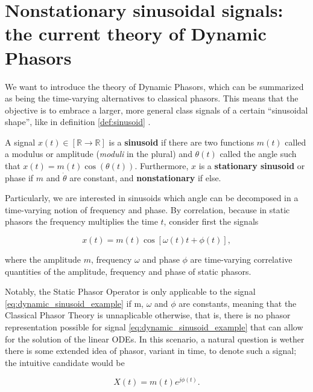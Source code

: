 \section{Nonstationary sinusoidal signals: the current theory of Dynamic Phasors} %

	We want to introduce the theory of Dynamic Phasors, which can be summarized as being the time-varying alternatives to classical phasors. This means that the objective is to embrace a larger, more general class signals of a certain ``sinusoidal shape'', like in definition \ref{def:sinusoid} .

\begin{definition}[Sinusoid] \label{def:sinusoid} %
	A signal $x(t)\in\left[\mathbb{R}\to\mathbb{R}\right]$ is a \textbf{sinusoid} if there are two functions $m(t)$ called a modulus or amplitude (\textit{moduli} in the plural) and $\theta(t)$ called the angle such that $x(t) = m(t)\cos\left(\theta(t)\right)$. Furthermore, $x$ is a \textbf{stationary sinusoid} or phase if $m$ and $\dot{\theta}$ are constant, and \textbf{nonstationary} if else.
\end{definition} %

	Particularly, we are interested in sinusoids which angle can be decomposed in a time-varying notion of frequency and phase. By correlation, because in static phasors the frequency multiplies the time $t$, consider first the signals

\begin{equation} x(t) = m\left(t\right)\cos\left[\omega(t) t + \phi(t)\right], \label{eq:dynamic_sinusoid_example}\end{equation}

	\noindent where the amplitude $m$, frequency $\omega$ and phase $\phi$ are time-varying correlative quantities of the amplitude, frequency and phase of static phasors.

	Notably, the Static Phasor Operator is only applicable to the signal \eqref{eq:dynamic_sinusoid_example} if m, $\omega$ and $\phi$ are constants, meaning that the Classical Phasor Theory is unnaplicable otherwise, that is, there is no phasor representation possible for signal \eqref{eq:dynamic_sinusoid_example} that can allow for the solution of the linear ODEs. In this scenario, a natural question is wether there is some extended idea of phasor, variant in time, to denote such a signal; the intuitive candidate would be

\begin{equation} X(t) = m\left(t\right)e^{j\phi(t)}. \end{equation}

